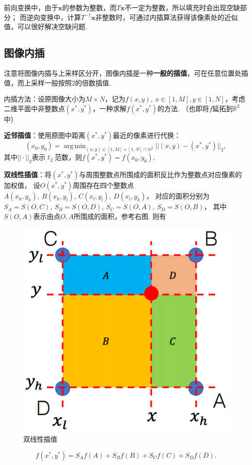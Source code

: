 \documentclass[12pt, a4paper, oneside]{ctexart}
\numberwithin{equation}{section}  %
\theoremstyle{definition}
\DeclareMathOperator*{\argmin}{arg\,min}  %
\def\bd{\boldsymbol}        %
\def\R{\mathbb{R}}          %
\def\N{\mathbb{N}}          %
\def\del{\vspace{-1.5ex}}   %
\begin{document}
前向变换中，由于$\bd{x}$的参数为整数，而$T\bd{x}$不一定为整数，所以填充时会出现空缺部分；
而逆向变换中，计算$T^{-1}\bd{x}$非整数时，可通过内插算法获得该像素处的近似值，可以很好解决空缺问题.

\subsection{图像内插}
注意将图像内插与上采样区分开，图像内插是一种\textbf{一般的插值}，可在任意位置处插值，而上采样一般按照$2$的倍数插值.

内插方法：设原图像大小为$M\times N$，记为$f(x,y),\ x\in[1,M],y\in[1,N]$，考虑二维平面中非整数点$(x^*, y^*)$，一种求解$f(x^*,y^*)$的方法.
（也即将$f$延拓到$\R^2$中）

\textbf{近邻插值}：使用原图中距离$(x^*,y^*)$最近的像素进行代换：
\begin{equation*}
 (x_0,y_0) = \argmin_{(x,y)\in[1,M]\times[1,N]\cap \N^2}||(x,y)-(x^*,y^*)||_2,
\end{equation*}
其中$||\cdot||_2$表示$\ell_2$范数，则$f(x^*,y^*) = f(x_0,y_0)$.

\textbf{双线性插值}：将$(x^*,y^*)$与周围整数点所围成的面积反比作为整数点对应像素的加权值，
设$O(x^*,y^*)$周围存在四个整数点$A(x_h, y_h),\ B(x_h, y_l),\ C(x_l, y_l),\ D(x_l, y_h)$，
对应的面积分别为$S_A = S(O,C),\ S_B = S(O, D),\ S_C = S(O, A),\ S_D = S(O, B)$，
其中$S(O,A)$表示由点$O,A$所围成的面积，参考右图. 则有\del\del

{\begin{figure} %
    \centering
    \includegraphics[scale=1.2]{双线性插值.png}
    \caption{双线性插值}
\end{figure}
\begin{equation*}
    f(x^*, y^*) = S_Af(A)+S_Bf(B)+S_Cf(C)+S_Df(D).
\end{equation*}}
\vspace{2cm}
\end{document}
